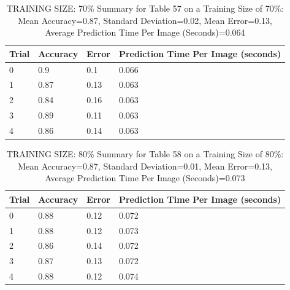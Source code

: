 \documentclass{article}
\begin{document}
\begin{table}[H]

\centering
{\begin{tabular}{||p{1cm}|p{1.8cm}|p{1.8cm}|p{3cm}||}
 \hline
Trial & Accuracy & Error & Prediction Time Per Image (seconds) \\ [0.5ex] 
 \hline\hline
   0  & 0.9  & 0.1  & 0.066\\
\hline
   1  & 0.87  & 0.13  & 0.063\\
\hline
   2  & 0.84  & 0.16  & 0.063\\
\hline
   3  & 0.89  & 0.11  & 0.063\\
\hline
   4  & 0.86  & 0.14  & 0.063\\
\hline

\end{tabular}}
\caption{TRAINING SIZE: 70\% \newline Summary for Table 57 on a Training Size of 70\%: Mean Accuracy=0.87, Standard Deviation=0.02, Mean Error=0.13, Average Prediction Time Per Image (Seconds)=0.064}
\end{table} 

\begin{table}[H]

\centering
{\begin{tabular}{||p{1cm}|p{1.8cm}|p{1.8cm}|p{3cm}||}
 \hline
Trial & Accuracy & Error & Prediction Time Per Image (seconds) \\ [0.5ex] 
 \hline\hline
   0  & 0.88  & 0.12  & 0.072\\
\hline
   1  & 0.88  & 0.12  & 0.073\\
\hline
   2  & 0.86  & 0.14  & 0.072\\
\hline
   3  & 0.87  & 0.13  & 0.072\\
\hline
   4  & 0.88  & 0.12  & 0.074\\
\hline


\end{tabular}}
\caption{TRAINING SIZE: 80\% \newline Summary for Table 58 on a Training Size of 80\%: Mean Accuracy=0.87, Standard Deviation=0.01, Mean Error=0.13, Average Prediction Time Per Image (Seconds)=0.073}
\end{table} 
\end{document}
